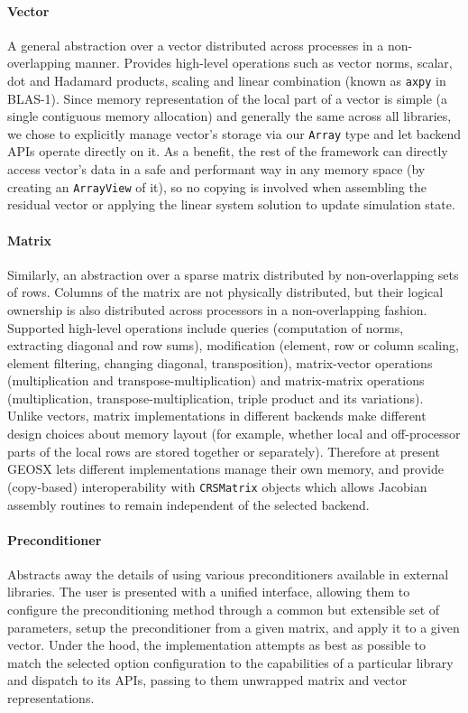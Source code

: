 \paragraph{Vector}
A general abstraction over a vector distributed across processes in a non-overlapping manner.   Provides high-level operations such as vector norms, scalar, dot and Hadamard products, scaling and linear combination (known as \texttt{axpy} in BLAS-1).   Since memory representation of the local part of a vector is simple (a single contiguous memory allocation) and generally the same across all libraries, we chose to explicitly manage vector's storage via our \texttt{Array} type and let backend APIs operate directly on it.   As a benefit, the rest of the framework can directly access vector's data in a safe and performant way in any memory space (by creating an \texttt{ArrayView} of it), so no copying is involved when assembling the residual vector or applying the linear system solution to update simulation state.

\paragraph{Matrix}
Similarly, an abstraction over a sparse matrix distributed by non-overlapping sets of rows.   Columns of the matrix are not physically distributed, but their logical ownership is also distributed across processors in a non-overlapping fashion.   Supported high-level operations include queries (computation of norms, extracting diagonal and row sums), modification (element, row or column scaling, element filtering, changing diagonal, transposition), matrix-vector operations (multiplication and transpose-multiplication) and matrix-matrix operations (multiplication, transpose-multiplication, triple product and its variations).   Unlike vectors, matrix implementations in different backends make different design choices about memory layout (for example, whether local and off-processor parts of the local rows are stored together or separately).   Therefore at present GEOSX lets different implementations manage their own memory, and provide (copy-based) interoperability with \texttt{CRSMatrix} objects which allows Jacobian assembly routines to remain independent of the selected backend.
 
\paragraph{Preconditioner} 
Abstracts away the details of using various preconditioners available in external libraries.   The user is presented with a unified interface, allowing them to configure the preconditioning method through a common but extensible set of parameters, setup the preconditioner from a given matrix, and apply it to a given vector.   Under the hood, the implementation attempts as best as possible to match the selected option configuration to the capabilities of a particular library and dispatch to its APIs, passing to them unwrapped matrix and vector representations.


